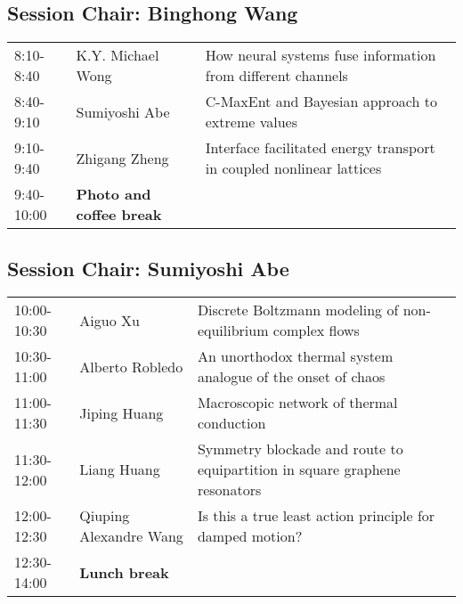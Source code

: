 \documentclass[oneside,A4paper,12pt]{article}
\begin{document}
\subsection*{Session \uppercase\expandafter{}  \hspace{10mm} Chair: Binghong Wang}
\label{sec:orge9b3873}
\begin{center}
\begin{tabular}{p{2.5cm}p{4.8cm}p{7.5cm}}
\toprule
8:10-8:40 & K.Y. Michael Wong & How neural systems fuse information from different channels\\
8:40-9:10 & Sumiyoshi Abe & C-MaxEnt and Bayesian approach to extreme values\\
9:10-9:40 & Zhigang Zheng & Interface facilitated energy transport in coupled nonlinear lattices\\
\cellcolor{blue!25}9:40-10:00 & \cellcolor{blue!25}\textbf{Photo and coffee break} & \cellcolor{blue!25}\\
\bottomrule
\end{tabular}
\end{center}


\subsection*{Session \uppercase\expandafter{}  \hspace{10mm} Chair: Sumiyoshi Abe}
\label{sec:org38a703a}


\begin{center}
\begin{tabular}{p{2.5cm}p{4.5cm}p{8.5cm}}
\toprule
10:00-10:30 & Aiguo Xu & Discrete Boltzmann modeling of non-equilibrium complex flows\\
10:30-11:00 & Alberto Robledo & An unorthodox thermal system analogue of the onset of chaos\\
11:00-11:30 & Jiping Huang & Macroscopic network of thermal conduction\\
11:30-12:00 & Liang Huang & Symmetry blockade and route to equipartition in square graphene resonators\\
12:00-12:30 & Qiuping Alexandre Wang & Is this a true least action principle for damped motion?\\
\cellcolor{blue!25}12:30-14:00 & \cellcolor{blue!25}\textbf{Lunch break} & \cellcolor{blue!25}\\
\bottomrule
\end{tabular}
\end{center}
\end{document}
